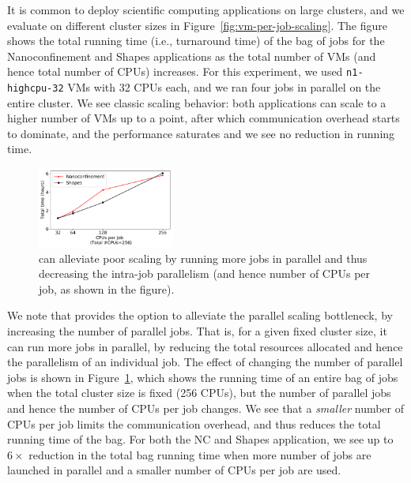 It is common to deploy scientific computing applications on large clusters, and we evaluate \sysname on different cluster sizes in Figure~\ref{fig:vm-per-job-scaling}.
The figure shows the total running time (i.e., turnaround time) of the bag of jobs for the Nanoconfinement and Shapes applications as the total number of VMs (and hence total number of CPUs) increases.
For this experiment, we used \texttt{n1-highcpu-32} VMs with 32 CPUs each, and we ran four jobs in parallel on the entire cluster. 
We see classic scaling behavior: both applications can scale to a higher number of VMs up to a point, after which communication overhead starts to dominate, and the performance saturates and we see no reduction in running time. 


\begin{figure}
  \includegraphics[width=0.4\textwidth]{../graphs/par-scaling.pdf}
      \vspace*{\myfigspace}
  \caption{\sysname can alleviate poor scaling by running more jobs in parallel and thus decreasing the intra-job parallelism (and hence number of CPUs per job, as shown in the figure).}
  \label{fig:par-scaling}
    \vspace*{\myfigspace}
\end{figure}


We note that \sysname provides the option to alleviate the parallel scaling bottleneck, by increasing the number of parallel jobs.
That is, for a given fixed cluster size, it can run more jobs in parallel, by reducing the total resources allocated and hence the parallelism 
of an individual job. 
The effect of changing the number of parallel jobs is shown in Figure~\ref{fig:par-scaling}, which shows the running time of an entire bag of jobs when the total cluster size is fixed (256 CPUs), but the number of parallel jobs and hence the number of CPUs per job changes.
We see that a \emph{smaller} number of CPUs per job limits the communication overhead, and thus reduces the total running time of the bag.
For both the NC and Shapes application, we see up to $6\times$ reduction in the total bag running time when more number of jobs are launched in parallel and a smaller number of CPUs per job are used. 


